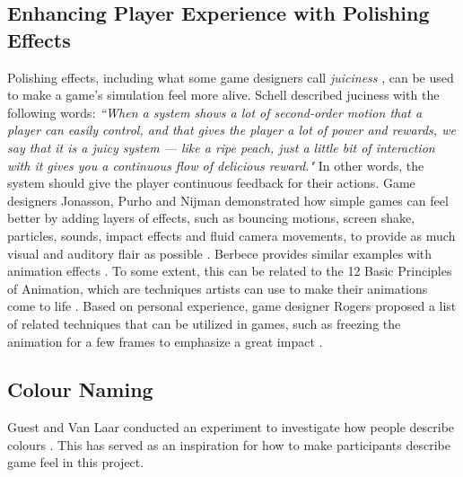 \subsection{Enhancing Player Experience with Polishing Effects} \label{polishSection}
Polishing effects, including what some game designers call \textit{juiciness} \cite{juice3}, can be used to make a game's simulation feel more alive. Schell described juciness with the following words: \textit{``When a system shows a lot of second-order motion that a player can easily control, and that gives the player a lot of power and rewards, we say that it is a juicy system --- like a ripe peach, just a little bit of interaction with it gives you a continuous flow of delicious reward."} \cite{schell_art_2008} In other words, the system should give the player continuous feedback for their actions. Game designers Jonasson, Purho and Nijman demonstrated how simple games can feel better by adding layers of effects, such as bouncing motions, screen shake, particles, sounds, impact effects and fluid camera movements, to provide as much visual and auditory flair as possible \cite{juice1, juice2}. Berbece provides similar examples with animation effects \cite{animationSucks}. To some extent, this can be related to the 12 Basic Principles of Animation, which are techniques artists can use to make their animations come to life \cite{animation}. Based on personal experience, game designer Rogers proposed a list of related techniques that can be utilized in games, such as freezing the animation for a few frames to emphasize a great impact \cite{sticky}.


\subsection{Colour Naming} \label{colour}
Guest and Van Laar conducted an experiment to investigate how people describe colours \cite{guest_structure_2000}. This has served as an inspiration for how to make participants describe game feel in this project.

